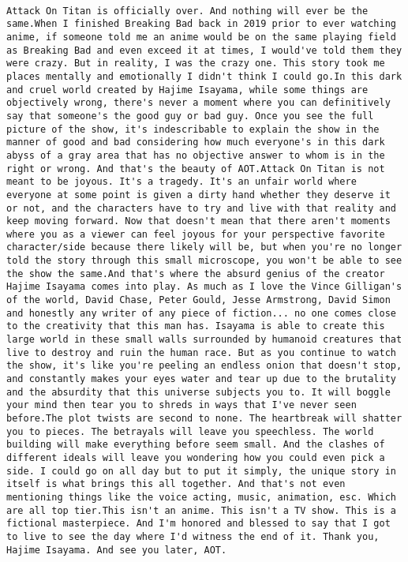 \documentclass[
]{article}
\begin{document}
\begin{verbatim}
                                                                                                                                                                                                                                                                                                 Attack On Titan is officially over. And nothing will ever be the same.When I finished Breaking Bad back in 2019 prior to ever watching anime, if someone told me an anime would be on the same playing field as Breaking Bad and even exceed it at times, I would've told them they were crazy. But in reality, I was the crazy one. This story took me places mentally and emotionally I didn't think I could go.In this dark and cruel world created by Hajime Isayama, while some things are objectively wrong, there's never a moment where you can definitively say that someone's the good guy or bad guy. Once you see the full picture of the show, it's indescribable to explain the show in the manner of good and bad considering how much everyone's in this dark abyss of a gray area that has no objective answer to whom is in the right or wrong. And that's the beauty of AOT.Attack On Titan is not meant to be joyous. It's a tragedy. It's an unfair world where everyone at some point is given a dirty hand whether they deserve it or not, and the characters have to try and live with that reality and keep moving forward. Now that doesn't mean that there aren't moments where you as a viewer can feel joyous for your perspective favorite character/side because there likely will be, but when you're no longer told the story through this small microscope, you won't be able to see the show the same.And that's where the absurd genius of the creator Hajime Isayama comes into play. As much as I love the Vince Gilligan's of the world, David Chase, Peter Gould, Jesse Armstrong, David Simon and honestly any writer of any piece of fiction... no one comes close to the creativity that this man has. Isayama is able to create this large world in these small walls surrounded by humanoid creatures that live to destroy and ruin the human race. But as you continue to watch the show, it's like you're peeling an endless onion that doesn't stop, and constantly makes your eyes water and tear up due to the brutality and the absurdity that this universe subjects you to. It will boggle your mind then tear you to shreds in ways that I've never seen before.The plot twists are second to none. The heartbreak will shatter you to pieces. The betrayals will leave you speechless. The world building will make everything before seem small. And the clashes of different ideals will leave you wondering how you could even pick a side. I could go on all day but to put it simply, the unique story in itself is what brings this all together. And that's not even mentioning things like the voice acting, music, animation, esc. Which are all top tier.This isn't an anime. This isn't a TV show. This is a fictional masterpiece. And I'm honored and blessed to say that I got to live to see the day where I'd witness the end of it. Thank you, Hajime Isayama. And see you later, AOT.

\end{verbatim}
\end{document}
